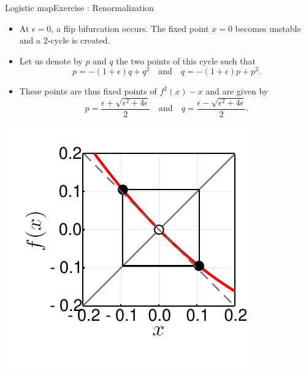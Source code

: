 \documentclass[usenames,dvipsnames,svgnames,10pt,aspectratio=169]{beamer}
\begin{document}
\begin{frame}[t, c]{Logistic map}{Exercise : Renormalization}
	\begin{minipage}{.68\textwidth}
		\begin{itemize}
			\item At \( \epsilon = 0 \), a flip bifurcation occurs. The fixed point \( x = 0 \) becomes unstable and a 2-cycle is created.

			\medskip

			\item Let us denote by \( p \) and \( q \) the two points of this cycle such that
			\[
				p = -(1 + \epsilon) q + q^2 \quad \text{and} \quad q = -(1 + \epsilon) p + p^2.
			\]

			\item These points are thus fixed points of \(f^2(x) - x\) and are given by
			\[
				p = \frac{\epsilon + \sqrt{\epsilon^2 + 4\epsilon}}{2} \quad \text{and} \quad q = \frac{\epsilon - \sqrt{\epsilon^2 + 4\epsilon}}{2}.
			\]
		\end{itemize}
	\end{minipage}%
	\hfill
	\begin{minipage}{.28\textwidth}
		\includegraphics[width=\textwidth]{renormalization_flip_bifurcation}
	\end{minipage}

	\vspace{1cm}
\end{frame}
\end{document}
